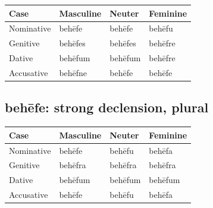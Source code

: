 \par\begingroup
\fontsize{10.5}{13.2}\selectfont
\setlength{\LTleft}{0pt}\setlength{\LTright}{\fill}
\noindent
\begin{tabular}{@{}>{\raggedright\arraybackslash}p{28.89mm}>{\raggedright\arraybackslash}p{28.89mm}>{\raggedright\arraybackslash}p{28.89mm}>{\raggedright\arraybackslash}p{28.89mm}@{}}
\toprule
\textbf{Case} & \textbf{Masculine} & \textbf{Neuter} & \textbf{Feminine} \\
\midrule
Nominative & behēfe & behēfe & behēfu \\
Genitive & behēfes & behēfes & behēfre \\
Dative & behēfum & behēfum & behēfre \\
Accusative & behēfne & behēfe & behēfe \\
\bottomrule
\end{tabular}
\par\endgroup

\subsection*{behēfe: strong declension, plural}

\par\begingroup
\fontsize{10.5}{13.2}\selectfont
\setlength{\LTleft}{0pt}\setlength{\LTright}{\fill}
\noindent
\begin{tabular}{@{}>{\raggedright\arraybackslash}p{28.89mm}>{\raggedright\arraybackslash}p{28.89mm}>{\raggedright\arraybackslash}p{28.89mm}>{\raggedright\arraybackslash}p{28.89mm}@{}}
\toprule
\textbf{Case} & \textbf{Masculine} & \textbf{Neuter} & \textbf{Feminine} \\
\midrule
Nominative & behēfe & behēfu & behēfa \\
Genitive & behēfra & behēfra & behēfra \\
Dative & behēfum & behēfum & behēfum \\
Accusative & behēfe & behēfu & behēfa \\
\bottomrule
\end{tabular}
\par\endgroup

